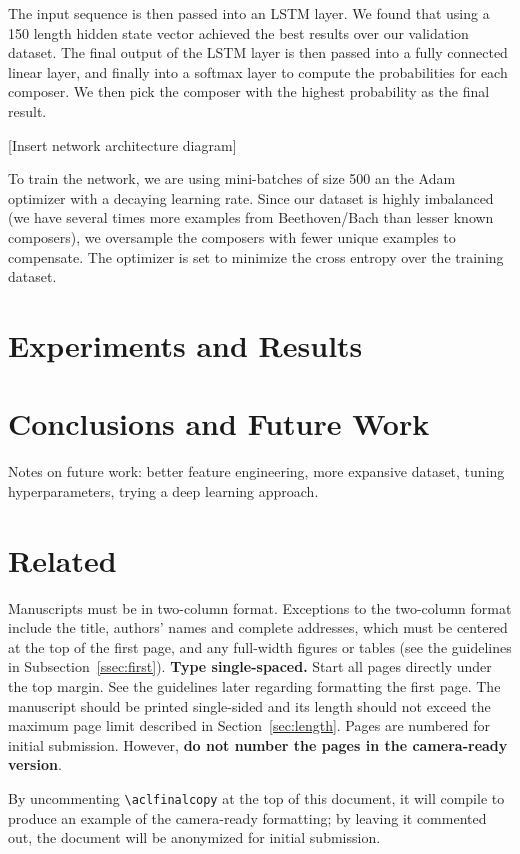 \documentclass[11pt,a4paper]{article}
\begin{document}
The input sequence is then passed into an LSTM layer. We found that using a 150 length hidden state vector achieved the best results over our validation dataset. The final output of the LSTM layer is then passed into a fully connected linear layer, and finally into a softmax layer to compute the probabilities for each composer. We then pick the composer with the highest probability as the final result.

[Insert network architecture diagram]

To train the network, we are using mini-batches of size 500 an the Adam optimizer with a decaying learning rate. Since our dataset is highly imbalanced (we have several times more examples from Beethoven/Bach than lesser known composers), we oversample the composers with fewer unique examples to compensate. The optimizer is set to minimize the cross entropy over the training dataset.

\section{Experiments and Results}

\section{Conclusions and Future Work}
Notes on future work: better feature engineering, more expansive dataset, tuning hyperparameters, trying a deep learning approach.

\section{Related }

Manuscripts must be in two-column format.  Exceptions to the
two-column format include the title, authors' names and complete
addresses, which must be centered at the top of the first page, and
any full-width figures or tables (see the guidelines in
Subsection~\ref{ssec:first}). {\bf Type single-spaced.}  Start all
pages directly under the top margin. See the guidelines later
regarding formatting the first page.  The manuscript should be
printed single-sided and its length
should not exceed the maximum page limit described in Section~\ref{sec:length}.
Pages are numbered for  initial submission. However, {\bf do not number the pages in the camera-ready version}.

By uncommenting {\small\verb|\aclfinalcopy|} at the top of this 
 document, it will compile to produce an example of the camera-ready formatting; by leaving it commented out, the document will be anonymized for initial submission.
\end{document}
